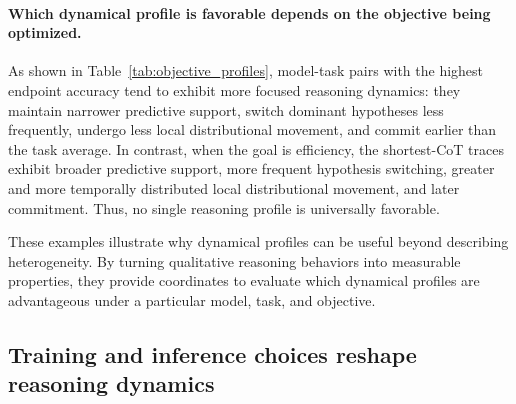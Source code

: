 \documentclass{article}
\begin{document}
\paragraph{Which dynamical profile is favorable depends on the objective being optimized.} As shown in Table~\ref{tab:objective_profiles}, model-task pairs with the highest endpoint accuracy tend to exhibit more focused reasoning dynamics: they maintain narrower predictive support, switch dominant hypotheses less frequently, undergo less local distributional movement, and commit earlier than the task average. In contrast, when the goal is efficiency, the shortest-CoT traces exhibit broader predictive support, more frequent hypothesis switching, greater and more temporally distributed local distributional movement, and later commitment. Thus, no single reasoning profile is universally favorable.

These examples illustrate why dynamical profiles can be useful beyond describing heterogeneity. By turning qualitative reasoning behaviors into measurable properties, they provide coordinates to evaluate which dynamical profiles are advantageous under a particular model, task, and objective.

\begin{table}[t]
\centering
\caption{Different objectives favor different dynamical profiles. Standardized mean profiles for high-accuracy and short-CoT model-task pairs. Values denote deviations from the task mean in standard deviation units.}
\label{tab:objective_profiles}
\small
{}
\end{table}


\subsection{Training and inference choices reshape reasoning dynamics}
\label{sec:reshaping-dynamics}
\end{document}
